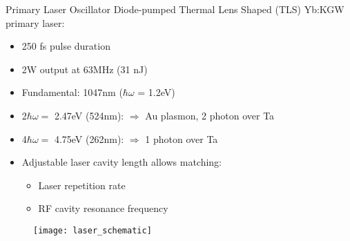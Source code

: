 \begin{frame}{Primary Laser Oscillator}
  Diode-pumped Thermal Lens Shaped (TLS) Yb:KGW primary laser:
  \begin{itemize}
    \item<2-> 250 fs pulse duration
    \item<3-> 2W output at 63MHz (31 nJ)
    \item<4-> Fundamental: 1047nm ($\hbar \omega$ = 1.2eV)
    \item<5-> 2$\hbar \omega = $ 2.47eV (524nm): $\Rightarrow$ Au plasmon, 2 photon over Ta
    \item<6-> 4$\hbar \omega = $ 4.75eV (262nm): $\Rightarrow$ 1 photon over Ta
    \item<7-> Adjustable laser cavity length allows matching:
    \begin{itemize}
      \item<7-> Laser repetition rate
      \item<7-> RF cavity resonance frequency
    \end{itemize}
  \end{itemize}
  \begin{figure}
    \centering
    \texttt{[image: laser\_schematic]}
  \end{figure}
\end{frame}

